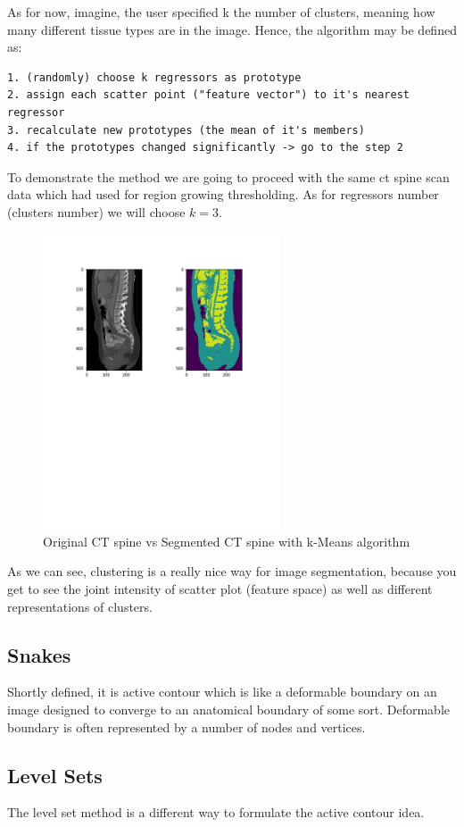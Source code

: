 As for now, imagine, the user specified k the number of clusters, meaning how many different tissue types are in the image.
Hence, the algorithm may be defined as:
\begin{lstlisting}
1. (randomly) choose k regressors as prototype
2. assign each scatter point ("feature vector") to it's nearest regressor
3. recalculate new prototypes (the mean of it's members)
4. if the prototypes changed significantly -> go to the step 2 
\end{lstlisting}
To demonstrate the method we are going to proceed with the same ct spine scan data which had used for region growing thresholding. As for regressors number (clusters number) we will choose $k=3$.  

\newpage
\begin{figure}[h]
    \centering \includegraphics[width=7cm]{images/ct-spine-k-means-segmented.jpg}
    \vspace*{-40mm} \caption {Original CT spine vs Segmented CT spine with k-Means algorithm}
\end{figure}    

As we can see, clustering is a really nice way for image segmentation, because you get to see the joint intensity of scatter plot (feature space) as well as different representations of clusters.  

\subsection{Snakes}
Shortly defined, it is active contour which is like a deformable boundary on an image designed to converge to an anatomical boundary of some sort. Deformable boundary is often represented by a number of nodes and vertices.  

\subsection{Level Sets}
The level set method is a different way to formulate the active contour idea. %

